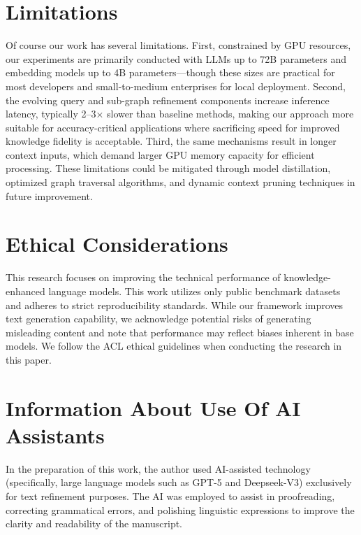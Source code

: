 \section*{Limitations}
Of course our work has several limitations. First, constrained by GPU resources, our experiments are primarily conducted with LLMs up to 72B parameters and embedding models up to 4B parameters—though these sizes are practical for most developers and small-to-medium enterprises for local deployment. Second, the evolving query and sub-graph refinement components increase inference latency, typically 2–3× slower than baseline methods, making our approach more suitable for accuracy-critical applications where sacrificing speed for improved knowledge fidelity is acceptable. Third, the same mechanisms result in longer context inputs, which demand larger GPU memory capacity for efficient processing.
These limitations could be mitigated through model distillation, optimized graph traversal algorithms, and dynamic context pruning techniques in future improvement.

\section*{Ethical Considerations}
This research focuses on improving the technical performance of knowledge-enhanced language models. This work utilizes only public benchmark datasets and adheres to strict reproducibility standards. While our framework improves text generation capability, we acknowledge potential risks of generating misleading content and note that performance may reflect biases inherent in base models. We follow the ACL ethical guidelines when conducting the research in this paper.

\section*{Information About Use Of AI Assistants}
In the preparation of this work, the author used AI-assisted technology (specifically, large language models such as GPT-5 and Deepseek-V3) exclusively for text refinement purposes. The AI was employed to assist in proofreading, correcting grammatical errors, and polishing linguistic expressions to improve the clarity and readability of the manuscript.